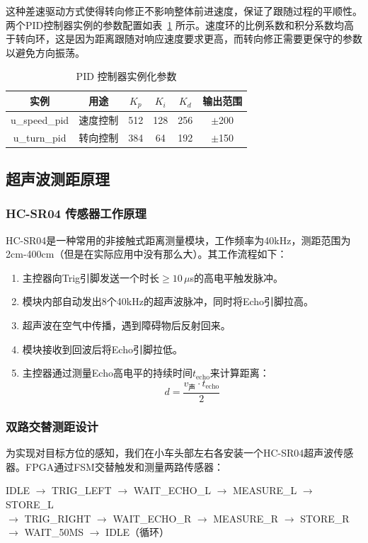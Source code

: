 \documentclass[12pt,a4paper]{ctexart}
\begin{document}
这种差速驱动方式使得转向修正不影响整体前进速度，保证了跟随过程的平顺性。两个PID控制器实例的参数配置如表~\ref{tab:pid_params} 所示。速度环的比例系数和积分系数均高于转向环，这是因为距离跟随对响应速度要求更高，而转向修正需要更保守的参数以避免方向振荡。

\begin{table}[H]
\centering
\caption{PID 控制器实例化参数}
\label{tab:pid_params}
\begin{tabular}{cccccc}
\toprule
\textbf{实例} & \textbf{用途} & \textbf{$K_p$} & \textbf{$K_i$} & \textbf{$K_d$} & \textbf{输出范围} \\
\midrule
u\_speed\_pid & 速度控制 & 512 & 128 & 256 & $\pm$200 \\
u\_turn\_pid  & 转向控制 & 384 & 64  & 192 & $\pm$150 \\
\bottomrule
\end{tabular}
\end{table}

\subsection{超声波测距原理}

\subsubsection{HC-SR04 传感器工作原理}

HC-SR04是一种常用的非接触式距离测量模块，工作频率为40kHz，测距范围为2cm-400cm（但是在实际应用中没有那么大）。其工作流程如下：

\begin{enumerate}[label=(\arabic*)]
    \item 主控器向Trig引脚发送一个时长$\ge 10\,\mu$s的高电平触发脉冲。
    \item 模块内部自动发出8个40kHz的超声波脉冲，同时将Echo引脚拉高。
    \item 超声波在空气中传播，遇到障碍物后反射回来。
    \item 模块接收到回波后将Echo引脚拉低。
    \item 主控器通过测量Echo高电平的持续时间$t_{\text{echo}}$来计算距离：
    \begin{equation}
    d = \frac{v_{\text{声}} \cdot t_{\text{echo}}}{2}
    \label{eq:distance}
    \end{equation}
\end{enumerate}

\subsubsection{双路交替测距设计}
为实现对目标方位的感知，我们在小车头部左右各安装一个HC-SR04超声波传感器。FPGA通过FSM交替触发和测量两路传感器：
\begin{center}
\textsf{IDLE $\to$ TRIG\_LEFT $\to$ WAIT\_ECHO\_L $\to$ MEASURE\_L $\to$ STORE\_L} \\
\textsf{$\to$ TRIG\_RIGHT $\to$ WAIT\_ECHO\_R $\to$ MEASURE\_R $\to$ STORE\_R} \\
\textsf{$\to$ WAIT\_50MS $\to$ IDLE（循环）}
\end{center}
\end{document}
